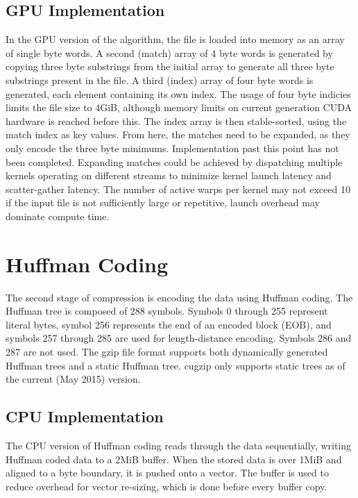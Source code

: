 \documentclass[twoside]{article}
\begin{document}
\begin{multicols}{2}
\subsection{GPU Implementation}

In the GPU version of the algorithm, the file is loaded into memory as an array of single byte words. A second (match) array of 4 byte words is generated by copying three byte substrings from the initial array to generate all three byte substrings present in the file. A third (index) array of four byte words is generated, each element containing its own index. The usage of four byte indicies limits the file size to 4GiB, although memory limits on current generation CUDA hardware is reached before this. The index array is then stable-sorted, using the match index as key values. From here, the matches need to be expanded, as they only encode the three byte minimums. Implementation past this point has not been completed. Expanding matches could be achieved by dispatching multiple kernels operating on different streams to minimize kernel launch latency and scatter-gather latency. The number of active warps per kernel may not exceed 10 if the input file is not sufficiently large or repetitive, launch overhead may dominate compute time.


\section{Huffman Coding}

The second stage of compression is encoding the data using Huffman coding. The Huffman tree is composed of 288 symbols. Symbols 0 through 255 represent literal bytes, symbol 256 represents the end of an encoded block (EOB), and symbols 257 through 285 are used for length-distance encoding. Symbols 286 and 287 are not used\cite{RFC1951}. The gzip file format supports both dynamically generated Huffman trees and a static Huffman tree. cugzip only supports static trees as of the current (May 2015) version.

\subsection{CPU Implementation}

The CPU version of Huffman coding reads through the data sequentially, writing Huffman coded data to a 2MiB buffer. When the stored data is over 1MiB and aligned to a byte boundary, it is pushed onto a vector. The buffer is used to reduce overhead for vector re-sizing, which is done before every buffer copy.


\end{multicols}
\end{document}
